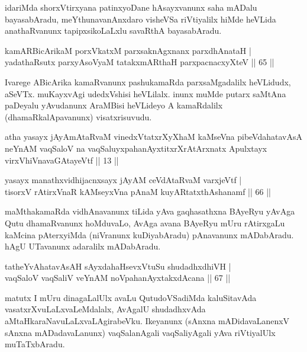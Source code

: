 \begin{artha}
idariMda shorxVtirxyana patinxyoDane hAsayxvanunx saha mADalu bayasabAradu, meYthunavanAnxdaro visheVSa riVtiyalilx hiMde heVLida anathaRvanunx tapipxsikoLaLxlu savaRthA bayasabAradu.
\end{artha}


\begin{shl}
kamAR\s \s BicArikaM porxVkatxM parxsaknAgxnanx parxdhAnataH | \\
yadathaRsutx parxyAsoV\s yaM tatakxmARthaH parxpacnacxyXteV \hfill|| 65 || 
\end{shl}

\begin{artha}
Ivarege ABicArika kamaRvanunx pashukamaRda parxsaMgadalilx heVLidudx, aSeVTx. muKayxvAgi udedxVshisi heVLilalx. inunx muMde putarx saMtAna paDeyalu yAvudanunx AraMBisi heVLideyo A kamaRdalilx (dhamaRkalApavanunx) visatxrisuvudu.
\end{artha}


\begin{shl}
atha yasayx jAyAmAtaRvaM vinedxVtatxrXyXhaM kaMseVna pibeVdahatavAsA neYnAM vaqSaloV na vaqSaluyxpahanAyxtitxrXrAtArxnatx Apulxtayx virxVhiVnavaGAtayeVtf || 13 ||
\end{shl}

\begin{shl}
yasayx manathxvidhijacnxsayx jAyAM ceVdAtaRvaM varxjeVtf | \\
tisorxV rAtirxVnaR kAMseyxVna pAnaM kuyARtatxthA\s shanamf  \hfill|| 66 || 
\end{shl}

\begin{artha}
maMthakamaRda vidhAnavanunx tiLida yAva gaqhasathxna BAyeRyu yAvAga 
Qutu dhamaRvanunx hoMduvaLo, AvAga avana BAyeRyu mUru rAtirxgaLu 
kaMcina pAterxyiMda (niVranunx kuDiyabAradu) pAnavanunx mADabAradu. 
hAgU UTavanunx adaralilx mADabAradu.
\end{artha}


\begin{shl}
tatheYvAhatavAsAH sAyxdahaHsevxVtuSu shudadhxdhiVH | \\
vaqSaloV vaqSaliV veYnAM noVpahanAyxtakxdAcana \hfill|| 67 || 
\end{shl}

\begin{artha}
matutx I mUru dinagaLalUlx avaLu QutudoVSadiMda kaluSitavAda vasatxrX\-vuLaLxvaLeMdalalx, AvAgalU shudadhxvAda aMtaHkaraNavuLaLxvaLAgirabeVku. Ikeyanunx (sAnxna mADidavaLanenxV sAnxna mADadavaLanunx) vaqSalanAgali vaqSaliyAgali yAva riVtiyalUlx muTaTxbAradu.
\end{artha}

